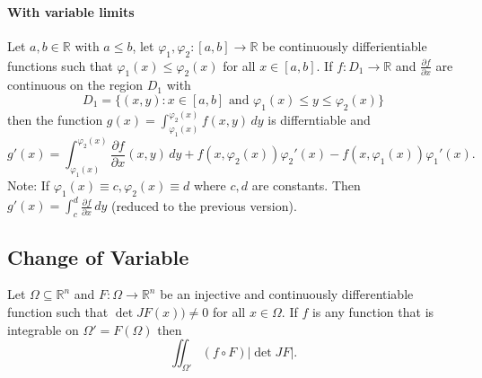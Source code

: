 \paragraph{With variable limits}
Let \(a, b \in \mathbb R\) with \(a \leq b\), let \(\varphi_1, \varphi_2 : [a,b] \to \mathbb R\) be continuously differientiable functions such that \(\varphi_1(x) \leq \varphi_2(x)\) for all \(x\in[a,b]\). If \(f: D_1 \to \mathbb R\) and \(\frac{\partial f}{\partial x}\) are continuous on the region \(D_1\) with 
\[D_1 = \{(x,y) : x\in[a,b] \text{ and } \varphi_1(x) \leq y \leq \varphi_2(x)\}\]
then the function \(g(x) = \int_{\varphi_1(x)}^{\varphi_2(x)} f(x,y) \, dy\) is differntiable and 
\[g'(x) = \int_{\varphi_1(x)}^{\varphi_2(x)} \frac{\partial f}{\partial x}(x,y) \, dy + f(x, \varphi_2(x))\varphi_2'(x) - f(x, \varphi_1(x))\varphi_1'(x).\]
Note: If \(\varphi_1(x) \equiv c, \varphi_2(x) \equiv d\) where \(c, d\) are constants. Then \(g'(x) = \int_c^d \frac{\partial f}{\partial x} \, dy\) (reduced to the previous version).

\subsection{Change of Variable}
Let \(\Omega\subseteq\mathbb R^n\) and \(F:\Omega \to \mathbb R^n\) be an injective and continuously differentiable function such that \(\det JF(x)) \neq 0\) for all \(x \in \Omega\). If \(f\) is any function that is integrable on \(\Omega' = F(\Omega)\) then
\[\iint_{\Omega'} (f \circ F)|\det JF|.\]
